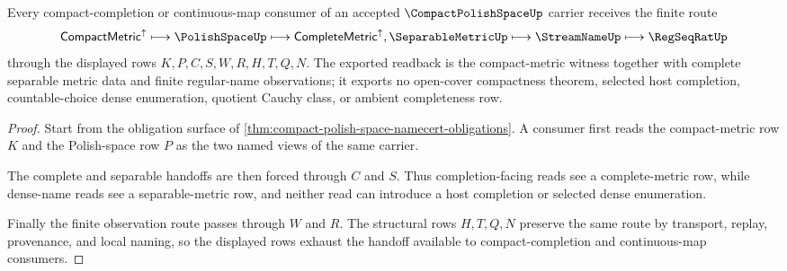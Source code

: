 \begin{theorem}
\label{thm:compact-polish-space-finite-cover-readback}
Every compact-completion or continuous-map consumer of an accepted $\CompactPolishSpaceUp$ carrier receives the finite route
$$
\mathsf{CompactMetric}^{\uparrow} \longmapsto \PolishSpaceUp \longmapsto \mathsf{CompleteMetric}^{\uparrow},\SeparableMetricUp \longmapsto \StreamNameUp \longmapsto \RegSeqRatUp
$$
through the displayed rows $K,P,C,S,W,R,H,T,Q,N$. The exported readback is the compact-metric witness together with complete separable metric data and finite regular-name observations; it exports no open-cover compactness theorem, selected host completion, countable-choice dense enumeration, quotient Cauchy class, or ambient completeness row.
\end{theorem}
\begin{proof}
Start from the obligation surface of \autoref{thm:compact-polish-space-namecert-obligations}. A consumer first reads the compact-metric row $K$ and the Polish-space row $P$ as the two named views of the same carrier.

The complete and separable handoffs are then forced through $C$ and $S$. Thus completion-facing reads see a complete-metric row, while dense-name reads see a separable-metric row, and neither read can introduce a host completion or selected dense enumeration.

Finally the finite observation route passes through $W$ and $R$. The structural rows $H,T,Q,N$ preserve the same route by transport, replay, provenance, and local naming, so the displayed rows exhaust the handoff available to compact-completion and continuous-map consumers.
\end{proof}

